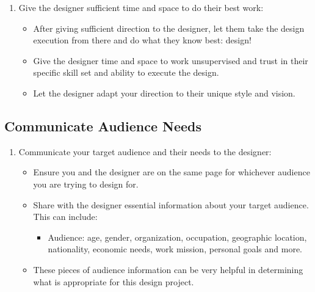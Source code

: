 \documentclass[
]{book}
\providecommand{\tightlist}{%
  \setlength{\itemsep}{0pt}\setlength{\parskip}{0pt}}
\begin{document}
\begin{enumerate}
\def\labelenumi{\arabic{enumi}.}
\setcounter{enumi}{3}
\tightlist
\item
  Give the designer sufficient time and space to do their best work:

  \begin{itemize}
  \tightlist
  \item
    After giving sufficient direction to the designer, let them take the design execution from there and do what they know best: design!
  \item
    Give the designer time and space to work unsupervised and trust in their specific skill set and ability to execute the design.
  \item
    Let the designer adapt your direction to their unique style and vision.
  \end{itemize}
\end{enumerate}

\hypertarget{communicate-audience-needs}{%
\subsection{Communicate Audience Needs}\label{communicate-audience-needs}}

\begin{enumerate}
\def\labelenumi{\arabic{enumi}.}
\tightlist
\item
  Communicate your target audience and their needs to the designer:

  \begin{itemize}
  \tightlist
  \item
    Ensure you and the designer are on the same page for whichever audience you are trying to design for.
  \item
    Share with the designer essential information about your target audience. This can include:

    \begin{itemize}
    \tightlist
    \item
      Audience: age, gender, organization, occupation, geographic location, nationality, economic needs, work mission, personal goals and more.
    \end{itemize}
  \item
    These pieces of audience information can be very helpful in determining what is appropriate for this design project.
  \end{itemize}
\end{enumerate}
\end{document}
